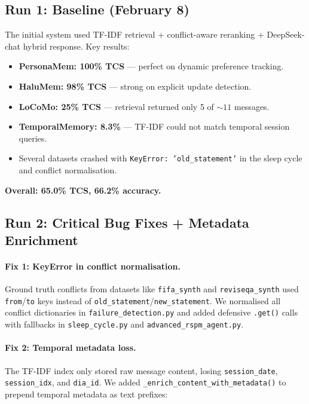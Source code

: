 \documentclass[11pt,a4paper]{article}
\begin{document}
\subsection{Run 1: Baseline (February 8)}

The initial system used TF-IDF retrieval + conflict-aware reranking +
DeepSeek-chat hybrid response.  Key results:

\begin{itemize}[nosep]
    \item \textbf{PersonaMem: 100\% TCS} --- perfect on dynamic preference tracking.
    \item \textbf{HaluMem: 98\% TCS} --- strong on explicit update detection.
    \item \textbf{LoCoMo: 25\% TCS} --- retrieval returned only 5 of ${\sim}11$ messages.
    \item \textbf{TemporalMemory: 8.3\%} --- TF-IDF could not match temporal session queries.
    \item Several datasets crashed with \texttt{KeyError: 'old\_statement'} in the sleep cycle
          and conflict normalisation.
\end{itemize}

\textbf{Overall: 65.0\% TCS, 66.2\% accuracy.}


\subsection{Run 2: Critical Bug Fixes + Metadata Enrichment}

\paragraph{Fix 1: KeyError in conflict normalisation.}
Ground truth conflicts from datasets like \texttt{fifa\_synth} and
\texttt{reviseqa\_synth} used \texttt{from}/\texttt{to} keys instead of
\texttt{old\_statement}/\texttt{new\_statement}.  We normalised all conflict
dictionaries in \texttt{failure\_detection.py} and added defensive
\texttt{.get()} calls with fallbacks in \texttt{sleep\_cycle.py} and
\texttt{advanced\_rspm\_agent.py}.

\paragraph{Fix 2: Temporal metadata loss.}
The TF-IDF index only stored raw message content, losing \texttt{session\_date},
\texttt{session\_idx}, and \texttt{dia\_id}.  We added
\texttt{\_enrich\_content\_with\_metadata()} to prepend temporal metadata as
text prefixes:
\end{document}
